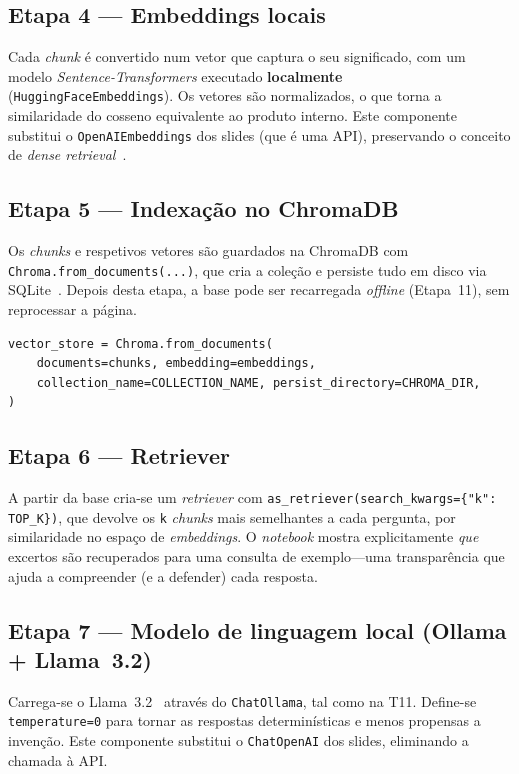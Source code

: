 \documentclass[]{ceurart}
\begin{document}
\subsection*{Etapa 4 --- Embeddings locais}

Cada \emph{chunk} é convertido num vetor que captura o seu significado, com um
modelo \emph{Sentence-Transformers} executado \textbf{localmente}
(\texttt{HuggingFaceEmbeddings}). Os vetores são normalizados, o que torna a
similaridade do cosseno equivalente ao produto interno. Este componente
substitui o \texttt{OpenAIEmbeddings} dos slides (que é uma API), preservando o
conceito de \emph{dense retrieval}~\cite{karpukhin2020dpr}.

\subsection*{Etapa 5 --- Indexação no ChromaDB}

Os \emph{chunks} e respetivos vetores são guardados na ChromaDB com
\texttt{Chroma.from\_documents(...)}, que cria a coleção e persiste tudo em disco
via SQLite~\cite{chromadb}. Depois desta etapa, a base pode ser recarregada
\emph{offline} (Etapa~11), sem reprocessar a página.

\begin{lstlisting}
vector_store = Chroma.from_documents(
    documents=chunks, embedding=embeddings,
    collection_name=COLLECTION_NAME, persist_directory=CHROMA_DIR,
)
\end{lstlisting}

\subsection*{Etapa 6 --- Retriever}

A partir da base cria-se um \emph{retriever} com
\texttt{as\_retriever(search\_kwargs=\{"k": TOP\_K\})}, que devolve os \texttt{k}
\emph{chunks} mais semelhantes a cada pergunta, por similaridade no espaço de
\emph{embeddings}. O \emph{notebook} mostra explicitamente \emph{que} excertos
são recuperados para uma consulta de exemplo---uma transparência que ajuda a
compreender (e a defender) cada resposta.

\subsection*{Etapa 7 --- Modelo de linguagem local (Ollama + Llama~3.2)}

Carrega-se o Llama~3.2~\cite{llama3} através do \texttt{ChatOllama}, tal como na
T11. Define-se \texttt{temperature=0} para tornar as respostas determinísticas e
menos propensas a invenção. Este componente substitui o \texttt{ChatOpenAI} dos
slides, eliminando a chamada à API.
\end{document}
